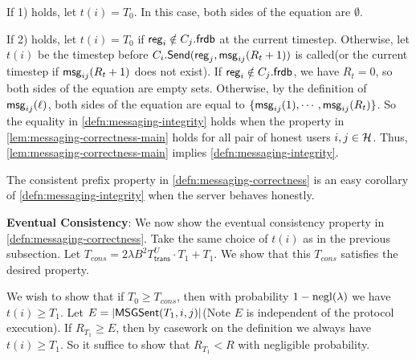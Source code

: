  If 1) holds, let $t(i) = T_0$. In this case, both sides of the equation are $\emptyset$.
 
 If 2) holds, let $t(i) = T_0$ if $\mathsf{reg}_i \notin C_j.\mathsf{frdb}$ at the current timestep. Otherwise, let $t(i)$ be the timestep before $C_i.\mathsf{Send}(\mathsf{reg}_j, \mathsf{msg}_{ij}(R_{t} + 1))$ is called(or the current timestep if $\mathsf{msg}_{ij}(R_{t} + 1)$ does not exist). If $\mathsf{reg}_i \notin C_j.\mathsf{frdb}$, we have $R_t = 0$, so both sides of the equation are empty sets. Otherwise, by the definition of $\mathsf{msg}_{ij}(\ell)$, both sides of the equation are equal to $\{\mathsf{msg}_{ij}(1),\cdots, \mathsf{msg}_{ij}(R_t)\}$. So the equality in \cref{defn:messaging-integrity} holds when the property in \cref{lem:messaging-correctness-main} holds for all pair of honest users $i, j \in \mathcal{H}$. Thus, \cref{lem:messaging-correctness-main} implies \cref{defn:messaging-integrity}.

The consistent prefix property in \cref{defn:messaging-correctness} is an easy corollary of \cref{defn:messaging-integrity} when the server behaves honestly.
 
 \textbf{Eventual Consistency}: We now show the eventual consistency property in \cref{defn:messaging-correctness}. Take the same choice of $t(i)$ as in the previous subsection. Let $T_{cons} = 2\lambda B^2 T^U_{\mathsf{trans}} \cdot T_1 + T_1.$ We show that this $T_{cons}$ satisfies the desired property. 
 
 We wish to show that if $T_0 \geq T_{cons}$, then with probability $1 - \operatorname{negl}(\lambda)$ we have $t(i) \geq T_1$. Let $E = \left| \mathsf{MSGSent}(T_1, i, j) \right|$(Note $E$ is independent of the protocol execution). If $R_{T_1} \geq E$, then by casework on the definition we always have $t(i) \geq T_1$. So it suffice to show that $R_{T_1} < R$ with negligible probability. 
 
